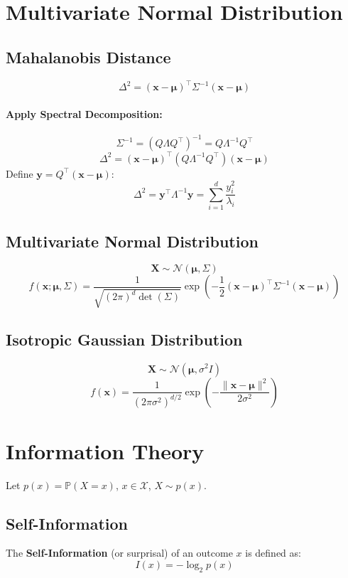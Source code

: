 \documentclass{article}
\begin{document}
\newpage
\section{Multivariate Normal Distribution}

\subsection{Mahalanobis Distance}
\[
    \Delta^2 = (\mathbf{x} - \boldsymbol{\mu})^\top \Sigma^{-1} (\mathbf{x} - \boldsymbol{\mu})
\]

\paragraph{Apply Spectral Decomposition:}
\[
    \Sigma^{-1} = (Q \Lambda Q^\top)^{-1} = Q \Lambda^{-1} Q^\top
\]
\[
    \Delta^2 = (\mathbf{x} - \boldsymbol{\mu})^\top (Q \Lambda^{-1} Q^\top) (\mathbf{x} - \boldsymbol{\mu})
\]
Define $ \mathbf{y} = Q^\top (\mathbf{x} - \boldsymbol{\mu}) $:
\[
    \Delta^2 = \mathbf{y}^\top \Lambda^{-1} \mathbf{y} = \sum_{i=1}^{d} \frac{y_i^2}{\lambda_i}
\]

\subsection{Multivariate Normal Distribution}
\[ \mathbf{X} \sim \mathcal{N}(\boldsymbol{\mu}, \Sigma) \]
\[
    f(\mathbf{x}; \boldsymbol{\mu}, \Sigma) = \frac{1}{\sqrt{(2\pi)^d\det(\Sigma)}} \exp\left(-\frac{1}{2}(\mathbf{x} - \boldsymbol{\mu})^\top \Sigma^{-1} (\mathbf{x} - \boldsymbol{\mu})\right)
\]

\subsection{Isotropic Gaussian Distribution}
\[ \mathbf{X} \sim \mathcal{N}(\boldsymbol{\mu}, \sigma^2 I) \]
\[
    f(\mathbf{x}) = \frac{1}{(2\pi\sigma^2)^{d/2}} \exp\left(-\frac{\|\mathbf{x} - \boldsymbol{\mu}\|^2}{2\sigma^2}\right)
\]


\newpage
\section{Information Theory}

Let $p(x) = \mathbb{P}(X=x)$, $x \in \mathcal{X}$, $X \sim p(x)$.

\subsection{Self-Information}
The \textbf{Self-Information} (or surprisal) of an outcome $x$ is defined as:
\[
    I(x) = -\log_2 p(x)
\]
\end{document}
